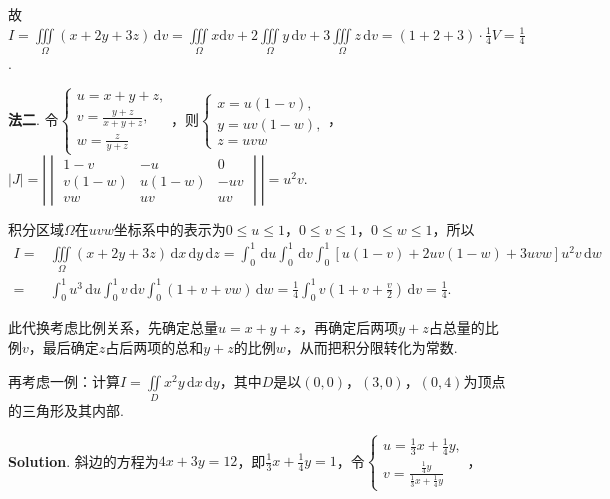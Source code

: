 \documentclass[../Main.tex]{subfiles}
\begin{document}
\begin{enumerate}
          故$I = \iiint\limits_{\Omega}(x+2y+3z)\,\mathrm{d}v = \iiint\limits_{\Omega}x
              \mathrm{d}v + 2\iiint\limits_{\Omega}y\,\mathrm{d}v + 3\iiint\limits_{\Omega}
              z\,\mathrm{d}v = (1+2+3)\cdot \frac{1}{4}V = \frac{1}{4}$.

          \textbf{法二}. 令$\begin{cases}
                  u = x+y+z,             \\
                  v = \frac{y+z}{x+y+z}, \\
                  w = \frac{z}{y+z}
              \end{cases}$，则$\begin{cases}
                  x = u(1-v),  \\
                  y = uv(1-w), \\
                  z = uvw
              \end{cases}$，$|J| = \left|
              \begin{vmatrix}
                  1-v    & -u     & 0   \\
                  v(1-w) & u(1-w) & -uv \\
                  vw     & uv     & uv
              \end{vmatrix}\right| = u^{2} v$.

          积分区域$\Omega$在$uvw$坐标系中的表示为$0\leq u \leq 1$，$0\leq v \leq 1$，$0
              \leq w \leq 1$，所以
          \[
              \begin{aligned}
                  I = & \iiint\limits_{\Omega}(x+2y+3z)\,\mathrm{d}x\,\mathrm{d}y\,\mathrm{d}z = \int_{0}^{1}\,\mathrm{d}u\int_{0}^{1}\,\mathrm{d}v\int_{0}^{1}\left[u(1-v)+2uv(1-w)+3uvw\right]u^{2} v\,\mathrm{d}w \\
                  =   & \int_{0}^{1}u^{3}\,\mathrm{d}u\int_{0}^{1}v\,\mathrm{d}v\int_{0}^{1}\left(1+v+vw\right)\,\mathrm{d}w = \frac{1}{4}\int_{0}^{1}v\left(1+v+\frac{v}{2}\right)\,\mathrm{d}v = \frac{1}{4}.
              \end{aligned}
          \]

          此代换考虑比例关系，先确定总量$u=x+y+z$，再确定后两项$y+z$占总量的比例$v$，最后确定$z$占后两项的总和$y
              +z$的比例$w$，从而把积分限转化为常数.

          再考虑一例：计算$I=\iint\limits_{D}x^{2} y\,\mathrm{d}x\,\mathrm{d}y$，其中$D$是以$(
              0,0)$，$(3,0)$，$(0,4)$为顶点的三角形及其内部.

          \textbf{Solution}. 斜边的方程为$4x+3y = 12$，即$\frac{1}{3}x+\frac{1}{4}y=1$，令$\begin{cases}
                  u = \frac{1}{3}x+\frac{1}{4}y, \\
                  v = \frac{\frac{1}{4}y}{\frac{1}{3}x+\frac{1}{4}y}
              \end{cases}$，


\end{enumerate}
\end{document}
